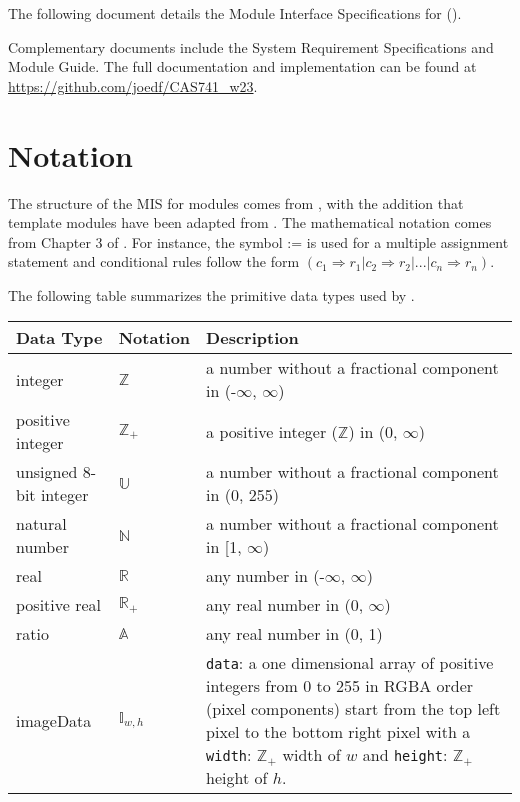 \documentclass[12pt, titlepage]{article}
\newcommand{\code}[1]{\texttt{#1}}
\begin{document}
The following document details the Module Interface Specifications for
\progname{} (\prognamelong{}).

Complementary documents include the System Requirement Specifications
and Module Guide.  The full documentation and implementation can be
found at \url{https://github.com/joedf/CAS741_w23}.

\section{Notation}

The structure of the MIS for modules comes from \citet{HoffmanAndStrooper1995},
with the addition that template modules have been adapted from
\cite{GhezziEtAl2003}.  The mathematical notation comes from Chapter 3 of
\citet{HoffmanAndStrooper1995}.  For instance, the symbol := is used for a
multiple assignment statement and conditional rules follow the form $(c_1
\Rightarrow r_1 | c_2 \Rightarrow r_2 | ... | c_n \Rightarrow r_n )$.

The following table summarizes the primitive data types used by \progname. 

\begin{center}
\renewcommand{\arraystretch}{1.2}
\noindent 
\begin{tabular}{l l p{7.5cm}} 
\toprule 
\textbf{Data Type} & \textbf{Notation} & \textbf{Description}\\ 
\midrule
integer & $\mathbb{Z}$ & a number without a fractional component in (-$\infty$, $\infty$) \\
positive integer & $\mathbb{Z}_+$ & a positive integer ($\mathbb{Z}$) in (0, $\infty$) \\
unsigned 8-bit integer & $\mathbb{U}$ & a number without a fractional component in (0, 255)\\
natural number & $\mathbb{N}$ & a number without a fractional component in [1, $\infty$) \\
real & $\mathbb{R}$ & any number in (-$\infty$, $\infty$)\\
positive real & $\mathbb{R}_+$ & any real number in (0, $\infty$)\\
ratio & $\mathbb{A}$ & any real number in (0, 1)\\
imageData \cite{MDN_imagedata} & $\mathbb{I}_{w,h}$ & \code{data}: a one dimensional array of positive integers from
  0 to 255 in RGBA order (pixel components) start from the top left pixel to the
  bottom right pixel with a \code{width}: $\mathbb{Z}_+$ width of $w$
  and \code{height}: $\mathbb{Z}_+$ height of $h$.\\
\bottomrule
\end{tabular} 
\end{center}
\end{document}
